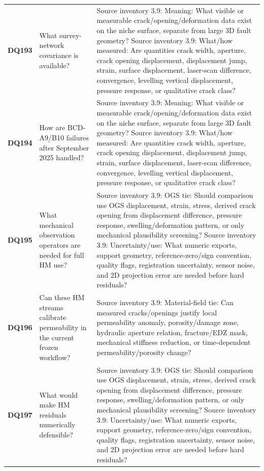 \begin{longtable}{@{}L{0.09\textwidth} L{0.31\textwidth} L{0.52\textwidth}@{}}
\addlinespace[0.18em]
\textbf{DQ193} & What survey-network covariance is available? & Source inventory 3.9: Meaning: What visible or measurable crack/opening/deformation data exist on the niche surface, separate from large 3D fault geometry? Source inventory 3.9: What/how measured: Are quantities crack width, aperture, crack opening displacement, displacement jump, strain, surface displacement, laser-scan difference, convergence, levelling vertical displacement, pressure response, or qualitative crack class?\\
\addlinespace[0.18em]
\textbf{DQ194} & How are BCD-A9/B10 failures after September 2025 handled? & Source inventory 3.9: Meaning: What visible or measurable crack/opening/deformation data exist on the niche surface, separate from large 3D fault geometry? Source inventory 3.9: What/how measured: Are quantities crack width, aperture, crack opening displacement, displacement jump, strain, surface displacement, laser-scan difference, convergence, levelling vertical displacement, pressure response, or qualitative crack class?\\
\addlinespace[0.18em]
\textbf{DQ195} & What mechanical observation operators are needed for full HM use? & Source inventory 3.9: OGS tie: Should comparison use OGS displacement, strain, stress, derived crack opening from displacement difference, pressure response, swelling/deformation pattern, or only mechanical plausibility screening? Source inventory 3.9: Uncertainty/use: What numeric exports, support geometry, reference-zero/sign convention, quality flags, registration uncertainty, sensor noise, and 2D projection error are needed before hard residuals?\\
\addlinespace[0.18em]
\textbf{DQ196} & Can these HM streams calibrate permeability in the current frozen workflow? & Source inventory 3.9: Material-field tie: Can measured cracks/openings justify local permeability anomaly, porosity/damage zone, hydraulic aperture relation, fracture/EDZ mask, mechanical stiffness reduction, or time-dependent permeability/porosity change?\\
\addlinespace[0.18em]
\textbf{DQ197} & What would make HM residuals numerically defensible? & Source inventory 3.9: OGS tie: Should comparison use OGS displacement, strain, stress, derived crack opening from displacement difference, pressure response, swelling/deformation pattern, or only mechanical plausibility screening? Source inventory 3.9: Uncertainty/use: What numeric exports, support geometry, reference-zero/sign convention, quality flags, registration uncertainty, sensor noise, and 2D projection error are needed before hard residuals?\\

\end{longtable}
